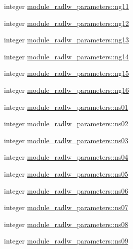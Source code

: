 \begin{DoxyCompactItemize}
\item 
integer \hyperlink{group__module__radlw__main_ga239b6c64459896a583e88c8ba2324348}{module\+\_\+radlw\+\_\+parameters\+::ng11}
\item 
integer \hyperlink{group__module__radlw__main_ga88f3b780d4dc9d4e45852fd41e111a21}{module\+\_\+radlw\+\_\+parameters\+::ng12}
\item 
integer \hyperlink{group__module__radlw__main_ga30e06652ca51875c17e56138eade5add}{module\+\_\+radlw\+\_\+parameters\+::ng13}
\item 
integer \hyperlink{group__module__radlw__main_ga32a603592af43d9de953c983a4e2f8c8}{module\+\_\+radlw\+\_\+parameters\+::ng14}
\item 
integer \hyperlink{group__module__radlw__main_ga1401bb43dbe665c21a17276cd82f4859}{module\+\_\+radlw\+\_\+parameters\+::ng15}
\item 
integer \hyperlink{group__module__radlw__main_gaf6c5d2407ab29bb09fd2c297d4524e74}{module\+\_\+radlw\+\_\+parameters\+::ng16}
\item 
integer \hyperlink{group__module__radlw__main_ga0f82508bbb4039ebbc3fcb68e8e4e699}{module\+\_\+radlw\+\_\+parameters\+::ns01}
\item 
integer \hyperlink{group__module__radlw__main_ga8b13d877f08e7c26333285fd1db19d4e}{module\+\_\+radlw\+\_\+parameters\+::ns02}
\item 
integer \hyperlink{group__module__radlw__main_ga987d257f8e2f0743e92055be94424401}{module\+\_\+radlw\+\_\+parameters\+::ns03}
\item 
integer \hyperlink{group__module__radlw__main_ga57f85389c924ba16fad61578170eadcc}{module\+\_\+radlw\+\_\+parameters\+::ns04}
\item 
integer \hyperlink{group__module__radlw__main_ga6bb5413129239f08596d4e7233c666a5}{module\+\_\+radlw\+\_\+parameters\+::ns05}
\item 
integer \hyperlink{group__module__radlw__main_gab936172cdf831f0b956c1475f175eca2}{module\+\_\+radlw\+\_\+parameters\+::ns06}
\item 
integer \hyperlink{group__module__radlw__main_gac60030c5a4655c6cee7be71dd527ffdc}{module\+\_\+radlw\+\_\+parameters\+::ns07}
\item 
integer \hyperlink{group__module__radlw__main_ga0a9944341bfe4507370bb6b617ac0476}{module\+\_\+radlw\+\_\+parameters\+::ns08}
\item 
integer \hyperlink{group__module__radlw__main_ga8948c9fe0a0f209c62e17e7c526940b8}{module\+\_\+radlw\+\_\+parameters\+::ns09}
\item 

\end{DoxyCompactItemize}
